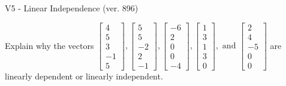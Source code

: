 \begin{exercise}
  \begin{exerciseTitle}V5 - Linear Independence (ver. 896)\end{exerciseTitle}
  \begin{exerciseStatement}
    Explain why the vectors \(\left[\begin{array}{r}
4 \\
5 \\
3 \\
-1 \\
5
\end{array}\right] , \left[\begin{array}{r}
5 \\
5 \\
-2 \\
2 \\
-1
\end{array}\right] , \left[\begin{array}{r}
-6 \\
2 \\
0 \\
0 \\
-4
\end{array}\right] , \left[\begin{array}{r}
1 \\
3 \\
1 \\
3 \\
0
\end{array}\right] , \text{ and } \left[\begin{array}{r}
2 \\
4 \\
-5 \\
0 \\
0
\end{array}\right]\) are linearly dependent or linearly independent.	



\end{exerciseStatement}
\end{exercise}
